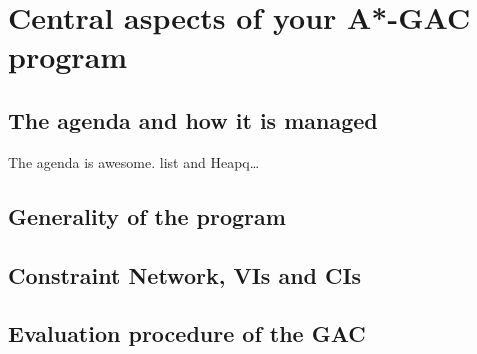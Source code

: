 
\section{Central aspects of your A*-GAC program}
\subsection{The agenda and how it is managed}
The agenda is awesome. list and Heapq\ldots

\subsection{Generality of the program}

\subsection*{Constraint Network, VIs and CIs}

\subsection{Evaluation procedure of the GAC}